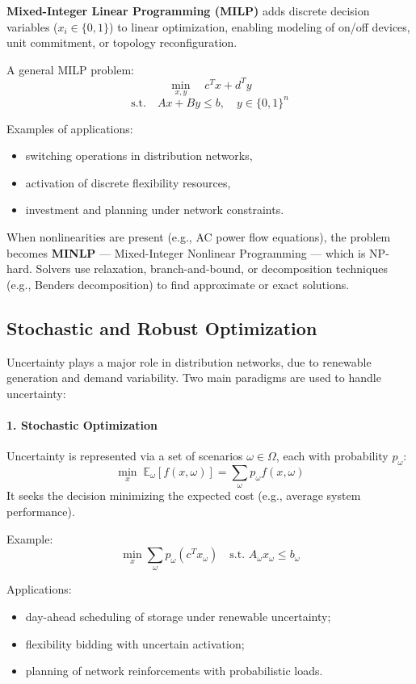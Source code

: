 \documentclass[11pt]{article}
\begin{document}
	\textbf{Mixed-Integer Linear Programming (MILP)} adds discrete decision variables ($x_i \in \{0,1\}$) to linear optimization, enabling modeling of on/off devices, unit commitment, or topology reconfiguration.
	
	A general MILP problem:
	\[
	\min_{x,y} \quad c^T x + d^T y
	\]
	\[
	\text{s.t.} \quad A x + B y \le b, \quad y \in \{0,1\}^n
	\]
	
	Examples of applications:
	\begin{itemize}
		\item switching operations in distribution networks,
		\item activation of discrete flexibility resources,
		\item investment and planning under network constraints.
	\end{itemize}
	
	When nonlinearities are present (e.g., AC power flow equations), the problem becomes \textbf{MINLP} — Mixed-Integer Nonlinear Programming — which is NP-hard.  
	Solvers use relaxation, branch-and-bound, or decomposition techniques (e.g., Benders decomposition) to find approximate or exact solutions.
	
	\subsection{Stochastic and Robust Optimization}
	
	Uncertainty plays a major role in distribution networks, due to renewable generation and demand variability.  
	Two main paradigms are used to handle uncertainty:
	
	\paragraph{1. Stochastic Optimization}
	Uncertainty is represented via a set of scenarios $\omega \in \Omega$, each with probability $p_\omega$:
	\[
	\min_{x} \; \mathbb{E}_\omega [ f(x, \omega) ] = \sum_\omega p_\omega f(x, \omega)
	\]
	It seeks the decision minimizing the expected cost (e.g., average system performance).
	
	Example:
	\[
	\min_{x} \sum_\omega p_\omega (c^T x_\omega)
	\quad \text{s.t. } A_\omega x_\omega \le b_\omega
	\]
	
	Applications:
	\begin{itemize}
		\item day-ahead scheduling of storage under renewable uncertainty;
		\item flexibility bidding with uncertain activation;
		\item planning of network reinforcements with probabilistic loads.
	\end{itemize}
	
\end{document}
